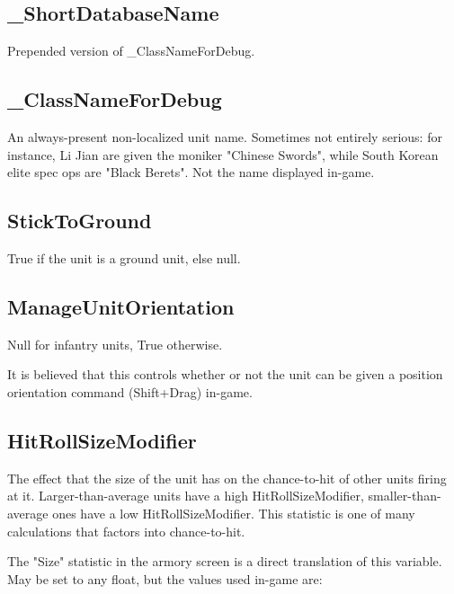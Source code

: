 \documentclass{article}
\begin{document}
\subsection{\_ShortDatabaseName}

Prepended version of \_ClassNameForDebug.

\subsection{\_ClassNameForDebug}

An always-present non-localized unit name. Sometimes not entirely serious: for instance, Li Jian are given the moniker "Chinese Swords", while South Korean elite spec ops are "Black Berets". Not the name displayed in-game.

\subsection{StickToGround}

True if the unit is a ground unit, else null.

\subsection{ManageUnitOrientation}

Null for infantry units, True otherwise.

It is believed that this controls whether or not the unit can be given a position orientation command (Shift+Drag) in-game. 

\subsection{HitRollSizeModifier}

The effect that the size of the unit has on the chance-to-hit of other units firing at it. Larger-than-average units have a high HitRollSizeModifier, smaller-than-average ones have a low HitRollSizeModifier. This statistic is one of many calculations that factors into chance-to-hit.

The "Size" statistic in the armory screen is a direct translation of this variable. May be set to any float, but the values used in-game are:
\end{document}
